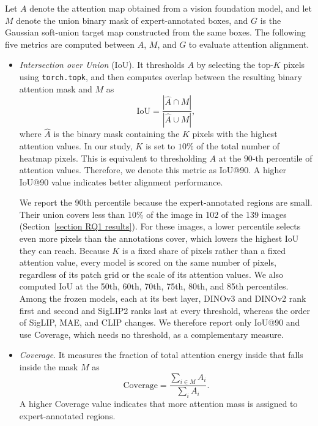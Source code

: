 \documentclass[lineno,pdflatex,sn-mathphys-num]{sn-jnl}%
\theoremstyle{thmstyleone}%
\theoremstyle{thmstyletwo}%
\theoremstyle{thmstylethree}%
\begin{document}
Let $A$ denote the attention map obtained from a vision foundation model, and let $M$ denote the union binary mask of expert-annotated boxes, and $G$ is the Gaussian soft-union target map constructed from the same boxes. The following five metrics are computed between $A$, $M$, and $G$ to evaluate attention alignment.

\begin{itemize}
\item \textit{Intersection over Union} (IoU). It thresholds $A$ by selecting the top-$K$ pixels using \texttt{torch.topk}, and then computes overlap between the resulting binary attention mask and $M$ as
\begin{equation}
\mathrm{IoU} = \frac{|\hat{A} \cap M|}{|\hat{A} \cup M|},
\end{equation}
where $\hat{A}$ is the binary mask containing the $K$ pixels with the highest attention values. In our study, $K$ is set to $10\%$ of the total number of heatmap pixels. This is equivalent to thresholding $A$ at the $90$-th percentile of attention values. Therefore, we denote this metric as IoU@90. A higher IoU@90 value indicates better alignment performance.

We report the 90th percentile because the expert-annotated regions are small. Their union covers less than 10\% of the image in 102 of the 139 images (Section~\ref{section RQ1 results}). For these images, a lower percentile selects even more pixels than the annotations cover, which lowers the highest IoU they can reach. Because $K$ is a fixed share of pixels rather than a fixed attention value, every model is scored on the same number of pixels, regardless of its patch grid or the scale of its attention values. We also computed IoU at the 50th, 60th, 70th, 75th, 80th, and 85th percentiles. Among the frozen models, each at its best layer, DINOv3 and DINOv2 rank first and second and SigLIP2 ranks last at every threshold, whereas the order of SigLIP, MAE, and CLIP changes. We therefore report only IoU@90 and use Coverage, which needs no threshold, as a complementary measure.

\item \textit{Coverage}. It measures the fraction of total attention energy inside that falls inside the mask $M$ as
\begin{equation}
\text{Coverage} = \frac{\sum_{i \in M} A_i}{\sum_i A_i}.
\end{equation}
A higher Coverage value indicates that more attention mass is assigned to expert-annotated regions.


\end{itemize}
\end{document}
